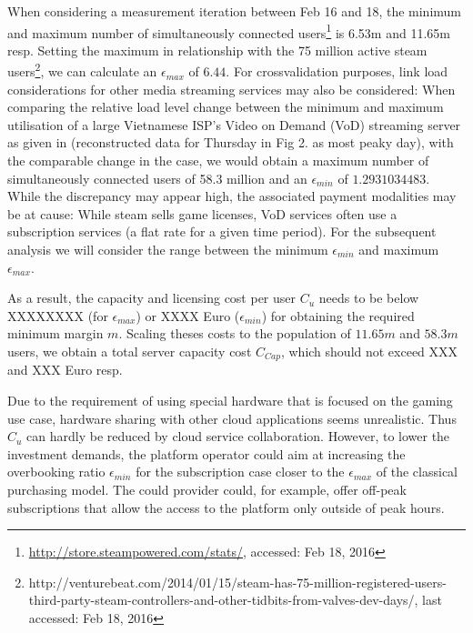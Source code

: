 When considering a measurement iteration between Feb 16 and 18, the minimum and maximum number of simultaneously connected users\footnote{\url{http://store.steampowered.com/stats/}, accessed: Feb 18, 2016} is 6.53m and 11.65m	 resp. Setting the maximum in relationship with the 75 million active steam users\footnote{http://venturebeat.com/2014/01/15/steam-has-75-million-registered-users-third-party-steam-controllers-and-other-tidbits-from-valves-dev-days/, last accessed: Feb 18, 2016}, we can calculate an $\epsilon_{max}$ of $6.44$. For crossvalidation purposes, link load considerations for other media streaming services may also be considered: When comparing the relative load level change between the minimum and maximum utilisation of a large Vietnamese ISP's Video on Demand (VoD) streaming server as given in \cite{thanh2012enabling} (reconstructed data for Thursday in Fig 2. as most peaky day), with the comparable change in the case, we would obtain a maximum number of simultaneously connected users of 58.3 million and an $\epsilon_{min}$ of $1.2931034483$. While the discrepancy may appear high, the associated payment modalities may be at cause: While steam sells game licenses, VoD services often use a subscription services (a flat rate for a given time period). For the subsequent analysis we will consider the range between the minimum $\epsilon_{min}$ and maximum $\epsilon_{max}$.

As a result, the capacity and licensing cost per user $C_u$ needs to be below XXXXXXXX (for $\epsilon_{max}$)  or XXXX Euro ($\epsilon_{min}$) for obtaining the required minimum margin $m$. Scaling theses costs to the population of $11.65m$ and  $58.3m$ users, we obtain a total server capacity cost $C_{Cap}$, which should not exceed XXX and XXX Euro resp. 





Due to the requirement of using special hardware that is focused on the gaming use case, hardware sharing with other cloud applications seems unrealistic. Thus $C_u$ can hardly be reduced by cloud service collaboration. However, to lower the investment demands, the platform operator could aim at increasing the overbooking ratio $\epsilon_{min}$ for the subscription case closer to the $\epsilon_{max}$ of the classical purchasing model. The could provider could, for example, offer off-peak subscriptions that allow the access to the platform only outside of peak hours.

